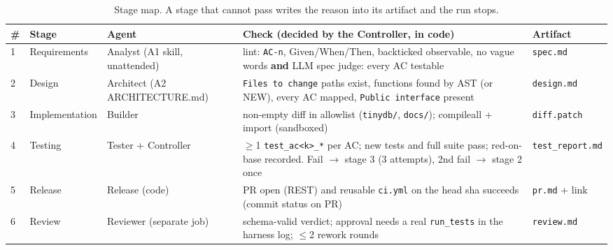 \documentclass[10pt,a4paper]{article}
\newcommand{\code}[1]{\texttt{#1}}
\begin{document}
\begin{table}[H]\centering\scriptsize
\begin{tabularx}{\linewidth}{@{}l l l X l@{}}
\toprule
\# & Stage & Agent & Check (decided by the Controller, in code) & Artifact\\
\midrule
1 & Requirements & Analyst (A1 skill, unattended) & lint: \code{AC-n}, Given/When/Then, backticked observable, no vague words \textbf{and} LLM spec judge: every AC testable & \code{spec.md}\\
2 & Design & Architect (A2 ARCHITECTURE.md) & \code{Files to change} paths exist, functions found by AST (or NEW), every AC mapped, \code{Public interface} present & \code{design.md}\\
3 & Implementation & Builder & non-empty diff in allowlist (\code{tinydb/}, \code{docs/}); compileall + import (sandboxed) & \code{diff.patch}\\
4 & Testing & Tester + Controller & $\ge$1 \code{test\_ac<k>\_*} per AC; new tests and full suite pass; red-on-base recorded. Fail $\to$ stage 3 (3 attempts), 2nd fail $\to$ stage 2 once & \code{test\_report.md}\\
5 & Release & Release (code) & PR open (REST) and reusable \code{ci.yml} on the head sha succeeds (commit status on PR) & \code{pr.md} + link\\
6 & Review & Reviewer (separate job) & schema-valid verdict; approval needs a real \code{run\_tests} in the harness log; $\le$2 rework rounds & \code{review.md}\\
\bottomrule
\end{tabularx}
\caption{Stage map. A stage that cannot pass writes the reason into its artifact and the run stops.}
\end{table}
\end{document}
